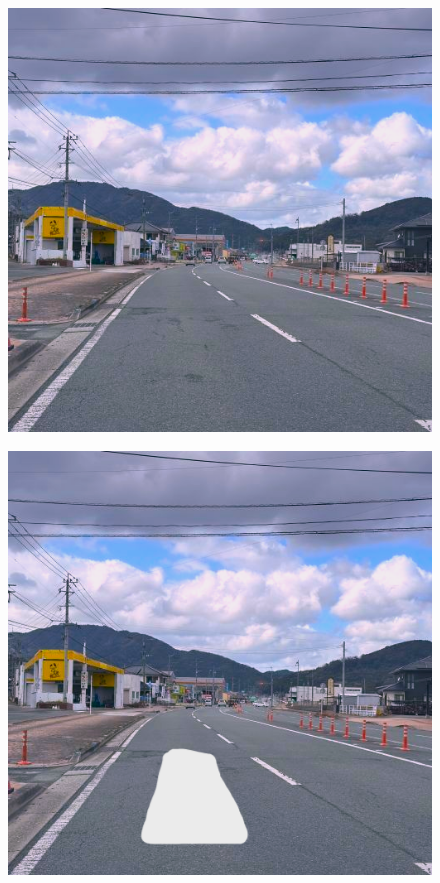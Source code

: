\documentclass[conference]{IEEEtran}
\begin{document}
\begin{figure}[tb]
  \begin{minipage}[]{0.32\columnwidth}
    \centering
    \includegraphics[width=0.9\columnwidth]{figures/Ex_pr1.png}
    \label{fig:2-3-2}
  \end{minipage}
  \begin{minipage}[]{0.32\linewidth}
    \centering
    \includegraphics[width=0.9\columnwidth]{figures/Ex_pr2.png}

\end{minipage}
\end{figure}
\end{document}

